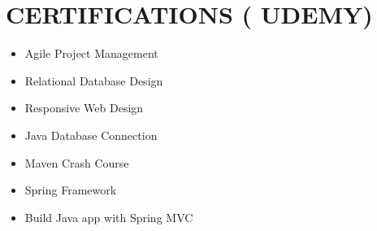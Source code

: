 \documentclass[letterpaper,11pt]{article}
\newcommand{\resumeItem}[1]{\item\small{{#1 \vspace{-3pt}}}}
\newcommand{\resumeItemListStart}{\begin{itemize}}
\newcommand{\resumeItemListEnd}{\end{itemize}\vspace{-5pt}}
\begin{document}
\section{{\fontsize{9pt}{20pt}\selectfont \textbf{CERTIFICATIONS ( UDEMY)}}}
\resumeItemListStart
\resumeItem{Agile Project Management}
\resumeItem{Relational Database Design}
\resumeItem{Responsive Web Design}
\resumeItem{Java Database Connection}
\resumeItem{Maven Crash Course}
\resumeItem{Spring Framework}
\resumeItem{Build Java app with Spring MVC}
\resumeItemListEnd
\vspace{-10pt}
\end{document}

